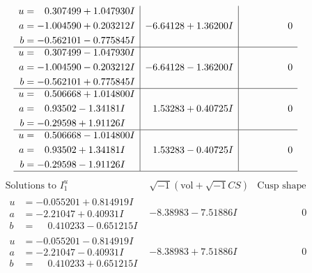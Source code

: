 \documentclass[1p]{elsarticle_modified}
\theoremstyle{definition}
\newcommand{\I}{\sqrt{-1}}
\begin{document}
$$\begin{array}{c|c|c}
\begin{aligned}
u &= \phantom{-}0.307499 + 1.047930 I \\
a &= -1.004590 + 0.203212 I \\
b &= -0.562101 - 0.775845 I\end{aligned}
 & -6.64128 + 1.36200 I & \phantom{-0.000000 } 0 \\ \hline\begin{aligned}
u &= \phantom{-}0.307499 - 1.047930 I \\
a &= -1.004590 - 0.203212 I \\
b &= -0.562101 + 0.775845 I\end{aligned}
 & -6.64128 - 1.36200 I & \phantom{-0.000000 } 0 \\ \hline\begin{aligned}
u &= \phantom{-}0.506668 + 1.014800 I \\
a &= \phantom{-}0.93502 - 1.34181 I \\
b &= -0.29598 + 1.91126 I\end{aligned}
 & \phantom{-}1.53283 + 0.40725 I & \phantom{-0.000000 } 0 \\ \hline\begin{aligned}
u &= \phantom{-}0.506668 - 1.014800 I \\
a &= \phantom{-}0.93502 + 1.34181 I \\
b &= -0.29598 - 1.91126 I\end{aligned}
 & \phantom{-}1.53283 - 0.40725 I & \phantom{-0.000000 } 0\\
 \hline 
 \end{array}$$\newpage$$\begin{array}{c|c|c}  
\text{Solutions to }I^u_{1}& \I (\text{vol} + \sqrt{-1}CS) & \text{Cusp shape}\\
 \hline 
\begin{aligned}
u &= -0.055201 + 0.814919 I \\
a &= -2.21047 + 0.40931 I \\
b &= \phantom{-}0.410233 - 0.651215 I\end{aligned}
 & -8.38983 - 7.51886 I & \phantom{-0.000000 } 0 \\ \hline\begin{aligned}
u &= -0.055201 - 0.814919 I \\
a &= -2.21047 - 0.40931 I \\
b &= \phantom{-}0.410233 + 0.651215 I\end{aligned}
 & -8.38983 + 7.51886 I & \phantom{-0.000000 } 0 \\ \hline\begin{aligned}

\end{aligned}
\end{array}$$
\end{document}
